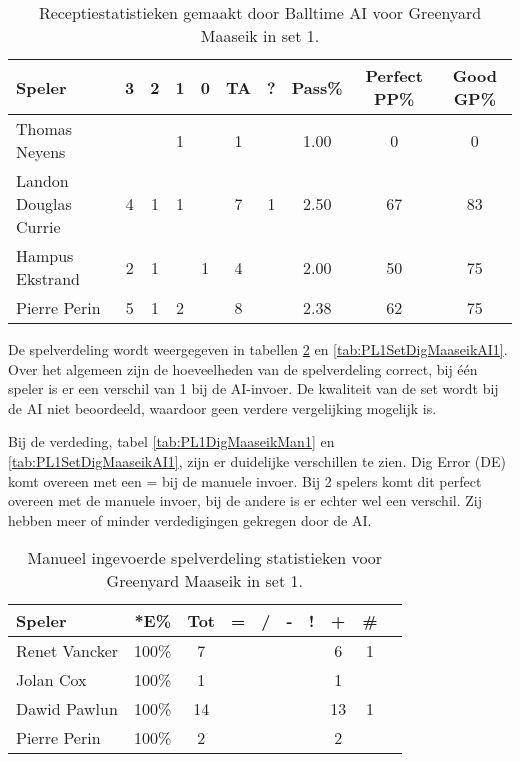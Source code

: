 \begin{table}[ht!]
  \centering
  \scriptsize
  \begin{tabular}{|l|c|c|c|c|c|c|c|c|c|} \hline
    \textbf{Speler} & 3 & 2 & 1 & 0 & TA & ? & Pass\% & Perfect PP\% & Good GP\% \\ \hline
    Thomas Neyens &  &  & 1 &  & 1 &  & 1.00 & 0 & 0  \\
    Landon Douglas Currie & 4 & 1 & 1 &  & 7 & 1 & 2.50 & 67 & 83 \\
    Hampus Ekstrand & 2 & 1 &  & 1 & 4 &  & 2.00 & 50 & 75 \\
    Pierre Perin & 5 & 1 & 2 &  & 8 &  & 2.38 & 62 & 75 \\ \hline
  \end{tabular}
  \caption[Receptiestatistieken gemaakt door Balltime AI voor Greenyard Maaseik in set 1]{\label{tab:PL1ReceiveMaaseikAI1}Receptiestatistieken gemaakt door Balltime AI voor Greenyard Maaseik in set 1.}
\end{table}

De spelverdeling wordt weergegeven in tabellen \ref{tab:PL1SetMaaseikMan1} en \ref{tab:PL1SetDigMaaseikAI1}. Over het algemeen zijn de hoeveelheden van de spelverdeling correct, bij één speler is er een verschil van 1 bij de AI-invoer. De kwaliteit van de set wordt bij de AI niet beoordeeld, waardoor geen verdere vergelijking mogelijk is.

Bij de verdeding, tabel \ref{tab:PL1DigMaaseikMan1} en \ref{tab:PL1SetDigMaaseikAI1}, zijn er duidelijke verschillen te zien. Dig Error (DE) komt overeen met een = bij de manuele invoer. Bij 2 spelers komt dit perfect overeen met de manuele invoer, bij de andere is er echter wel een verschil.  Zij hebben meer of minder verdedigingen gekregen door de AI.

\begin{table}[ht!]
    \centering
    \scriptsize
    \begin{tabular}{|l|c|c|c|c|c|c|c|c|c|} \hline
        \textbf{Speler}& *E\% & Tot & = & / & - & ! & + & \# \\ \hline
        Renet Vancker  & 100\% & 7 &  &  &  &  & 6 & 1  \\
        Jolan Cox  & 100\% & 1 &  &  &  &  & 1 &  \\ 
        Dawid Pawlun  & 100\% & 14 &  &  &  &  & 13 & 1  \\ 
        Pierre Perin & 100\% & 2 &  &  &  &  & 2 & \\ \hline
    \end{tabular}
    \caption[Manueel ingevoerde spelverdelingsstatistieken voor Greenyard Maaseik in set 1]{\label{tab:PL1SetMaaseikMan1}Manueel ingevoerde spelverdeling statistieken voor Greenyard Maaseik in set 1.}
\end{table}

